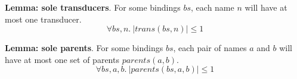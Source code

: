 \textbf{Lemma: sole transducers}.
For some bindings $bs$, each name $n$ will have at most one transducer.
\[
\forall bs, n.\ |trans(bs, n)| \le 1
\]

 
\textbf{Lemma: sole parents}.
For some bindings $bs$, each pair of names $a$ and $b$ will have at most one set of parents $parents(a,b)$.
\[
\forall bs, a, b.\ |parents(bs, a, b)| \le 1
\]

